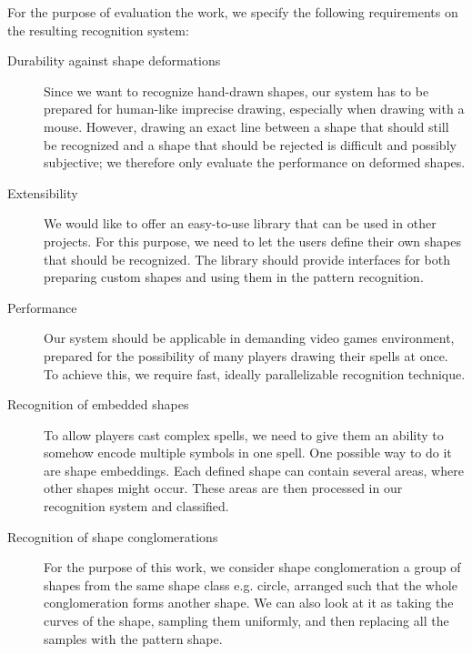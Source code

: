 For the purpose of evaluation the work, we specify the following requirements on the resulting recognition system:
\begin{description}

\item [Durability against shape deformations]
Since we want to recognize hand-drawn shapes, our system has to be prepared for human-like imprecise drawing, especially when drawing with a mouse. However, drawing an exact line between a shape that should still be recognized and a shape that should be rejected is difficult and possibly subjective; we therefore only evaluate the performance on deformed shapes.

\item [Extensibility]
We would like to offer an easy-to-use library that can be used in other projects. For this purpose, we need to let the users define their own shapes that should be recognized. The library should provide interfaces for both preparing custom shapes and using them in the pattern recognition.

\item [Performance]
Our system should be applicable in demanding video games environment, prepared for the possibility of many players drawing their spells at once. To achieve this, we require fast, ideally parallelizable recognition technique.

\item [Recognition of embedded shapes]
To allow players cast complex spells, we need to give them an ability to somehow encode multiple symbols in one spell. One possible way to do it are shape embeddings. Each defined shape can contain several areas, where other shapes might occur. These areas are then processed in our recognition system and classified.

\item [Recognition of shape conglomerations]
For the purpose of this work, we consider shape conglomeration a group of shapes from the same shape class e.g. circle, arranged such that the whole conglomeration forms another shape. We can also look at it as taking the curves of the shape, sampling them uniformly, and then replacing all the samples with the pattern shape.
\end{description}

